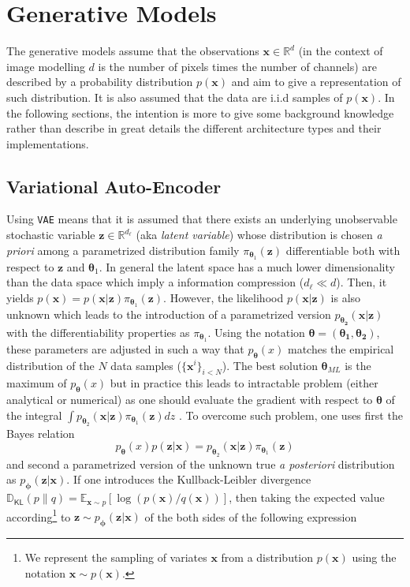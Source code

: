 \documentclass[11pt]{amsart}
\newcommand{\Esp}[0]{\ensuremath{\mathbb{E}}}
\newcommand{\DKL}[0]{\ensuremath{\mathbb{D}_{\mathsf{KL}}}}
\begin{document}
\section{Generative Models}
%
The generative models assume that the observations $\bm{x}\in \mathbb{R}^d$ (in the context of image modelling $d$ is the number of pixels  times the number of channels) are described by a probability distribution $p(\bm{x})$ and aim to give a representation of such distribution.  It is also assumed that the data are i.i.d samples of $p(\bm{x})$.  In the following sections, the intention is more to give some background knowledge rather than describe in great details the different  architecture types and their implementations.
%
\subsection{Variational Auto-Encoder}
%
Using \texttt{VAE} \citep{Kingma2014} means that it is assumed that there exists an underlying unobservable stochastic variable $\bm{z}\in\mathbb{R}^{d_\ell}$  (aka \textit{latent variable}) whose distribution is chosen \textit{a priori} among a parametrized distribution family $\pi_{\bm{\theta}_1}(\bm{z})$ differentiable both with respect to $\bm{z}$ and $\bm{\theta}_1$. In general the latent space has a much lower dimensionality than the data space which imply a information compression ($d_\ell \ll d$). Then, it yields $p(\bm{x}) = p(\bm{x}|\bm{z})\pi_{\bm{\theta}_1}(\bm{z})$. However, the likelihood  $p(\bm{x}|\bm{z})$ is also unknown which leads to the introduction of a parametrized version $p_{\bm{\theta_2}}(\bm{x}|\bm{z})$ with the differentiability properties as $\pi_{\bm{\theta}_1}$. Using the notation $\bm{\theta}=(\bm{\theta_1},\bm{\theta_2})$,  these parameters are adjusted in such a way that  $p_{\bm{\theta}}(x)$ matches the empirical distribution of the $N$ data samples ($\{\bm{x}^{i}\}_{i<N}$). The best solution $\bm{\theta}_{ML}$ is the maximum of $p_{\bm{\theta}}(x)$ but in practice this leads to  intractable problem (either analytical or numerical) as one should evaluate the gradient with respect to $\bm{\theta}$ of the integral 
$\int p_{\bm{\theta}_2}(\bm{x}|\bm{z})\pi_{\bm{\theta}_1}(\bm{z}) dz$ \citep{Kingma2014}. To overcome such problem, one uses first the Bayes relation
\begin{equation}
p_{\bm{\theta}}(x) p(\bm{z}|\bm{x}) = p_{\bm{\theta}_2}(\bm{x}|\bm{z})\pi_{\bm{\theta}_1}(\bm{z})
\end{equation}
and second a parametrized version of the unknown true \textit{a posteriori} distribution as $p_{\bm{\phi}}(\bm{z}|\bm{x})$. If one introduces the Kullback-Leibler divergence $\DKL(p\| q)=\Esp_{\bm{x}\sim p}[\log(p(\bm{x})/q(\bm{x}))]$, then taking the expected value according\footnote{We represent the sampling of variates $\bm{x}$ from a
distribution $p(\bm{x})$ using the notation $\bm{x}\sim p(\bm{x})$.} to $\bm{z}\sim p_{\bm{\phi}}(\bm{z}|\bm{x})$ of the both sides of the following expression
\end{document}
